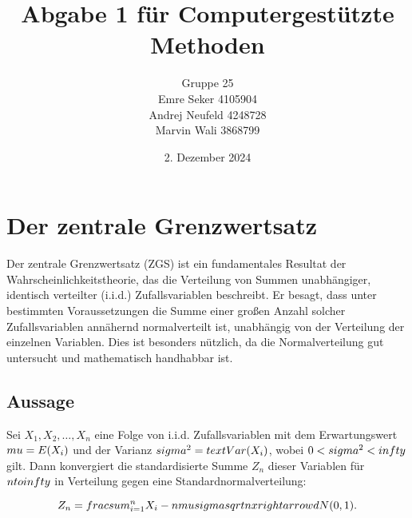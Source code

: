 \documentclass[12pt]{article}
\begin{document}
\title{Abgabe 1 für Computergestützte Methoden}
\author{Gruppe 25 
        \\Emre Seker 4105904
        \\Andrej Neufeld 4248728 
        \\Marvin Wali 3868799}

\date{2. Dezember 2024}

\maketitle
\newpage



\tableofcontents
\newpage

\section{Der zentrale Grenzwertsatz}
Der zentrale Grenzwertsatz (ZGS) ist ein fundamentales Resultat der Wahrscheinlichkeitstheorie, das die Verteilung von Summen unabhängiger, identisch verteilter (i.i.d.) Zufallsvariablen beschreibt. Er besagt, dass unter bestimmten Voraussetzungen die Summe einer großen Anzahl solcher Zufallsvariablen annähernd normalverteilt ist, unabhängig von der Verteilung der einzelnen Variablen. Dies ist besonders nützlich, da die Normalverteilung gut untersucht und mathematisch handhabbar ist.

\subsection{Aussage}
Sei $X_1, X_2, \dots, X_n$ eine Folge von i.i.d. Zufallsvariablen mit dem Erwartungswert $\\mu = E(X_i)$ und der Varianz $\\sigma^2 = \\text{Var}(X_i)$, wobei $0 < \\sigma^2 < \\infty$ gilt. Dann konvergiert die standardisierte Summe $Z_n$ dieser Variablen für $n \\to \\infty$ in Verteilung gegen eine Standardnormalverteilung:

\begin{equation}
Z_n = \\frac{\\sum_{i=1}^n X_i - n\\mu}{\\sigma\\sqrt{n}} \\xrightarrow{d} N(0,1).
\end{equation}
\end{document}
